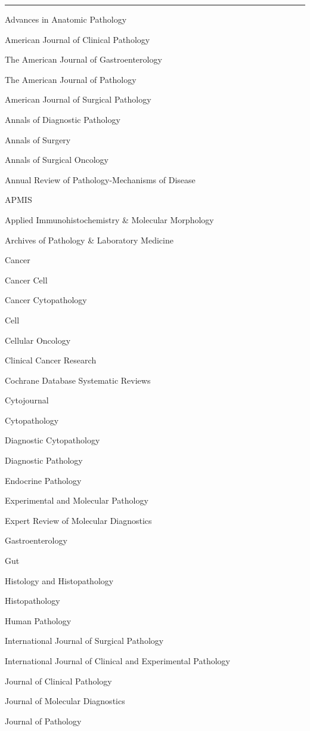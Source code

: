\documentclass[]{article}
\begin{document}
\begin{center}\rule{0.5\linewidth}{\linethickness}\end{center}

Advances in Anatomic Pathology

American Journal of Clinical Pathology

The American Journal of Gastroenterology

The American Journal of Pathology

American Journal of Surgical Pathology

Annals of Diagnostic Pathology

Annals of Surgery

Annals of Surgical Oncology

Annual Review of Pathology-Mechanisms of Disease

APMIS

Applied Immunohistochemistry \& Molecular Morphology

Archives of Pathology \& Laboratory Medicine

Cancer

Cancer Cell

Cancer Cytopathology

Cell

Cellular Oncology

Clinical Cancer Research

Cochrane Database Systematic Reviews

Cytojournal

Cytopathology

Diagnostic Cytopathology

Diagnostic Pathology

Endocrine Pathology

Experimental and Molecular Pathology

Expert Review of Molecular Diagnostics

Gastroenterology

Gut

Histology and Histopathology

Histopathology

Human Pathology

International Journal of Surgical Pathology

International Journal of Clinical and Experimental Pathology

Journal of Clinical Pathology

Journal of Molecular Diagnostics

Journal of Pathology
\end{document}
